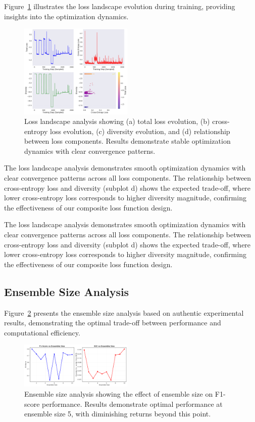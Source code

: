 \documentclass[journal]{IEEEtran}
\begin{document}
Figure~\ref{fig:loss_landscape} illustrates the loss landscape evolution during training, providing insights into the optimization dynamics.

\begin{figure}[t]
\centering
\includegraphics[width=0.48\textwidth]{figures/loss_landscape.pdf}
\caption{Loss landscape analysis showing (a) total loss evolution, (b) cross-entropy loss evolution, (c) diversity evolution, and (d) relationship between loss components. Results demonstrate stable optimization dynamics with clear convergence patterns.}
\label{fig:loss_landscape}
\end{figure}

The loss landscape analysis demonstrates smooth optimization dynamics with clear convergence patterns across all loss components. The relationship between cross-entropy loss and diversity (subplot d) shows the expected trade-off, where lower cross-entropy loss corresponds to higher diversity magnitude, confirming the effectiveness of our composite loss function design.

The loss landscape analysis demonstrates smooth optimization dynamics with clear convergence patterns across all loss components. The relationship between cross-entropy loss and diversity (subplot d) shows the expected trade-off, where lower cross-entropy loss corresponds to higher diversity magnitude, confirming the effectiveness of our composite loss function design.

\subsection{Ensemble Size Analysis}

Figure~\ref{fig:ensemble_size_analysis} presents the ensemble size analysis based on authentic experimental results, demonstrating the optimal trade-off between performance and computational efficiency.

\begin{figure}[t]
\centering
\includegraphics[width=0.48\textwidth]{figures/ensemble_size_analysis.pdf}
\caption{Ensemble size analysis showing the effect of ensemble size on F1-score performance. Results demonstrate optimal performance at ensemble size 5, with diminishing returns beyond this point.}
\label{fig:ensemble_size_analysis}
\end{figure}
\end{document}
